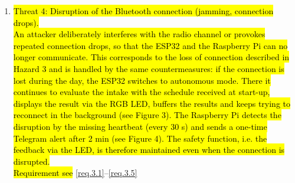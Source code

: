 \begin{enumerate}
  \item \hl{Threat 4: Disruption of the Bluetooth connection (jamming,
  connection drops).}\\
  \hl{An attacker deliberately interferes with the radio channel or provokes
  repeated connection drops, so that the ESP32 and the Raspberry Pi can no
  longer communicate. This corresponds to the loss of connection described in
  Hazard 3 and is handled by the same countermeasures: if the connection is lost
  during the day, the ESP32 switches to autonomous mode. There it continues to
  evaluate the intake with the schedule received at start-up, displays the
  result via the RGB LED, buffers the results and keeps trying to reconnect in
  the background (see Figure 3). The Raspberry Pi detects the disruption by the
  missing heartbeat (every 30 s) and sends a one-time Telegram alert after 2 min
  (see Figure 4). The safety function, i.e. the feedback via the LED, is
  therefore maintained even when the connection is disrupted.}\\
  \hl{Requirement see} \ref{req.3.1}--\ref{req.3.5}


\end{enumerate}
